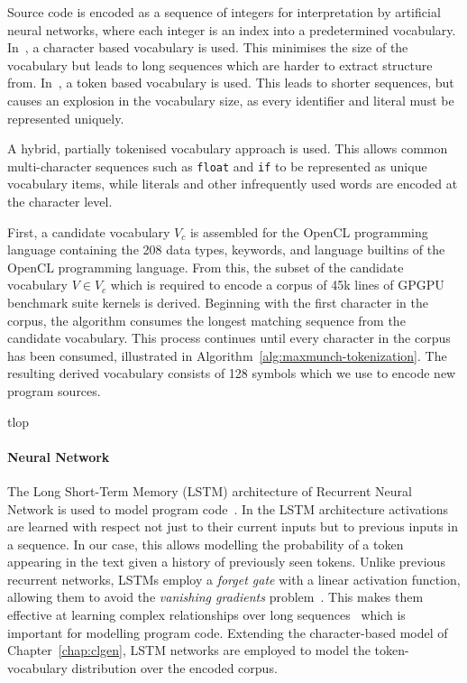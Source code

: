 Source code is encoded as a sequence of integers for interpretation by artificial neural networks, where each integer is an index into a predetermined vocabulary. In~\cite{Jozefowicz2016a}, a character based vocabulary is used. This minimises the size of the vocabulary but leads to long sequences which are harder to extract structure from. In~\cite{Allamanis2013a}, a token based vocabulary is used. This leads to shorter sequences, but causes an explosion in the vocabulary size, as every identifier and literal must be represented uniquely.

A hybrid, partially tokenised vocabulary approach is used. This allows common multi-character sequences such as \texttt{float} and \texttt{if} to be represented as unique vocabulary items, while literals and other infrequently used words are encoded at the character level.

First, a candidate vocabulary $V_c$ is assembled for the OpenCL programming language containing the 208 data types, keywords, and language builtins of the OpenCL programming language. From this, the subset of the candidate vocabulary $V \in V_c$ which is required to encode a corpus of 45k lines of GPGPU benchmark suite kernels is derived. Beginning with the first character in the corpus, the algorithm consumes the longest matching sequence from the candidate vocabulary. This process continues until every character in the corpus has been consumed, illustrated in Algorithm~\ref{alg:maxmunch-tokenization}. The resulting derived vocabulary consists of 128 symbols which we use to encode new program sources.

\begin{algorithm}{t}{lop}
  
  \caption[Deriving a vocabulary from a string]{%
    Deriving a vocabulary from a string.%
  }
  \label{alg:maxmunch-tokenization}
\end{algorithm}

\paragraph*{Neural Network}

The Long Short-Term Memory (LSTM) architecture of Recurrent Neural Network is used to model program code~\cite{Hochreiter1997}. In the LSTM architecture activations are learned with respect not just to their current inputs but to previous inputs in a sequence. In our case, this allows modelling the probability of a token appearing in the text given a history of previously seen tokens. Unlike previous recurrent networks, LSTMs employ a \emph{forget gate} with a linear activation function, allowing them to avoid the \emph{vanishing gradients} problem~\cite{Pacanu2013}. This makes them effective at learning complex relationships over long sequences~\cite{Lipton2015} which is important for modelling program code. Extending the character-based model of Chapter~\ref{chap:clgen}, LSTM networks are employed to model the token-vocabulary distribution over the encoded corpus.

